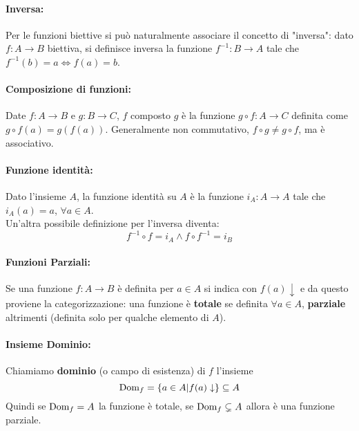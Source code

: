 \paragraph{Inversa:} Per le funzioni biettive si può naturalmente associare il concetto di "inversa": dato $f: A \rightarrow B$ biettiva, si definisce inversa la funzione $f^{-1}: B \rightarrow A$ tale che $f^{-1} (b) = a \Leftrightarrow f(a) = b$.\\

\paragraph{Composizione di funzioni:} Date $f: A \rightarrow B$ e $g: B \rightarrow C$, $f$ composto $g$ è la funzione $g \circ f: A \rightarrow C$ definita come $g \circ f(a) = g(f(a))$. Generalmente non commutativo, $f \circ g \neq g \circ f$, ma è associativo.\\

\paragraph{Funzione identità:} Dato l'insieme $A$, la funzione identità su $A$ è la funzione $i_A: A \rightarrow A$ tale che $i_A (a) = a$, $\forall a \in A$.\\

Un'altra possibile definizione per l'inversa diventa:
$$ f^{-1} \circ f = i_A \wedge f \circ f^{-1} = i_B $$

\paragraph{Funzioni Parziali:} Se una funzione $f: A \rightarrow B$ è definita per $a \in A$ si indica con $f(a) \downarrow$ e da questo proviene la categorizzazione: una funzione è \textbf{totale} se definita $\forall a \in A$, \textbf{parziale} altrimenti (definita solo per qualche elemento di $A$).\\

\paragraph{Insieme Dominio:} Chiamiamo \textbf{dominio} (o campo di esistenza) di $f$ l'insieme
$$ \text{Dom}_f = \left\{a \in A | f(a) \downarrow \right\} \subseteq A $$
Quindi se $\text{Dom}_f = A$ la funzione è totale, se $\text{Dom}_f \subsetneq A$ allora è una funzione parziale.\\

